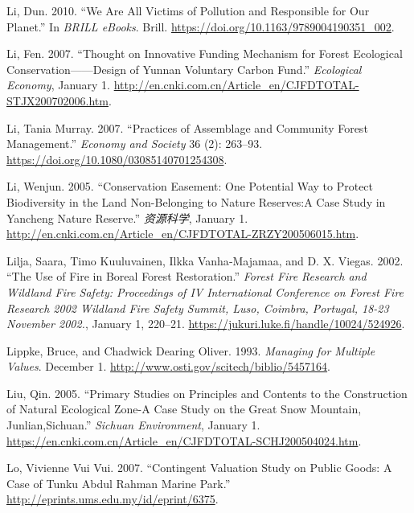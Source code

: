 \begin{CSLReferences}{1}{1}
Li, Dun. 2010. {``We Are All Victims of Pollution and Responsible for
Our Planet.''} In \emph{BRILL eBooks}. Brill.
\url{https://doi.org/10.1163/9789004190351_002}.

Li, Fen. 2007. {``Thought on Innovative Funding Mechanism for Forest
Ecological Conservation------Design of Yunnan Voluntary Carbon Fund.''}
\emph{Ecological Economy}, January 1.
\url{http://en.cnki.com.cn/Article_en/CJFDTOTAL-STJX200702006.htm}.

Li, Tania Murray. 2007. {``Practices of Assemblage and Community Forest
Management.''} \emph{Economy and Society} 36 (2): 263--93.
\url{https://doi.org/10.1080/03085140701254308}.

Li, Wenjun. 2005. {``Conservation Easement: One Potential Way to Protect
Biodiversity in the Land Non-Belonging to Nature Reserves:A Case Study
in Yancheng Nature Reserve.''} \emph{资源科学}, January 1.
\url{http://en.cnki.com.cn/Article_en/CJFDTOTAL-ZRZY200506015.htm}.

Lilja, Saara, Timo Kuuluvainen, Ilkka Vanha‐Majamaa, and D. X. Viegas.
2002. {``The Use of Fire in Boreal Forest Restoration.''} \emph{Forest
Fire Research and Wildland Fire Safety: Proceedings of IV International
Conference on Forest Fire Research 2002 Wildland Fire Safety Summit,
Luso, Coimbra, Portugal, 18-23 November 2002.}, January 1, 220--21.
\url{https://jukuri.luke.fi/handle/10024/524926}.

Lippke, Bruce, and Chadwick Dearing Oliver. 1993. \emph{Managing for
Multiple Values}. December 1.
\url{http://www.osti.gov/scitech/biblio/5457164}.

Liu, Qin. 2005. {``Primary Studies on Principles and Contents to the
Construction of Natural Ecological Zone-A Case Study on the Great Snow
Mountain, Junlian,Sichuan.''} \emph{Sichuan Environment}, January 1.
\url{https://en.cnki.com.cn/Article_en/CJFDTOTAL-SCHJ200504024.htm}.

Lo, Vivienne Vui Vui. 2007. {``Contingent Valuation Study on Public
Goods: A Case of Tunku Abdul Rahman Marine Park.''}
\url{http://eprints.ums.edu.my/id/eprint/6375}.


\end{CSLReferences}
